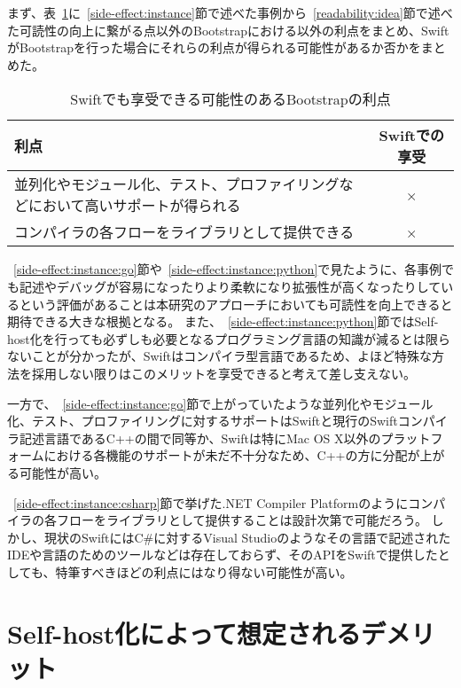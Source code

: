 まず、表~\ref{table:bootstrap-merit}に~\ref{side-effect:instance}節で述べた事例から~\ref{readability:idea}節で述べた可読性の向上に繋がる点以外のBootstrapにおける以外の利点をまとめ、SwiftがBootstrapを行った場合にそれらの利点が得られる可能性があるか否かをまとめた。

\begin{table}[hb]
    \begin{center}
        \caption{Swiftでも享受できる可能性のあるBootstrapの利点}
        \begin{tabular}{|m{10cm}|c|}
            \hline
            利点 & Swiftでの享受 \\
            \hline
            並列化やモジュール化、テスト、プロファイリングなどにおいて高いサポートが得られる & × \\
            \hline
            コンパイラの各フローをライブラリとして提供できる & × \\
            \hline
        \end{tabular}
        \label{table:bootstrap-merit}
    \end{center}
\end{table}


~\ref{side-effect:instance:go}節や~\ref{side-effect:instance:python}で見たように、各事例でも記述やデバッグが容易になったりより柔軟になり拡張性が高くなったりしているという評価があることは本研究のアプローチにおいても可読性を向上できると期待できる大きな根拠となる。
また、~\ref{side-effect:instance:python}節ではSelf-host化を行っても必ずしも必要となるプログラミング言語の知識が減るとは限らないことが分かったが、Swiftはコンパイラ型言語であるため、よほど特殊な方法を採用しない限りはこのメリットを享受できると考えて差し支えない。

一方で、~\ref{side-effect:instance:go}節で上がっていたような並列化やモジュール化、テスト、プロファイリングに対するサポートはSwiftと現行のSwiftコンパイラ記述言語であるC++の間で同等か、Swiftは特にMac OS X以外のプラットフォームにおける各機能のサポートが未だ不十分なため、C++の方に分配が上がる可能性が高い。

~\ref{side-effect:instance:csharp}節で挙げた.NET Compiler Platformのようにコンパイラの各フローをライブラリとして提供することは設計次第で可能だろう。
しかし、現状のSwiftにはC\#に対するVisual Studioのようなその言語で記述されたIDEや言語のためのツールなどは存在しておらず、そのAPIをSwiftで提供したとしても、特筆すべきほどの利点にはなり得ない可能性が高い。

\section{Self-host化によって想定されるデメリット}
\label{side-effect:swift:demerit}

